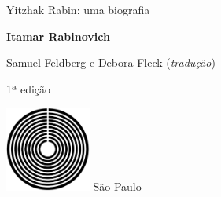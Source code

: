 




\begingroup\thispagestyle{empty}\vspace*{.05\textheight} 

              \formular
              
              \LARGE\noindent
              Yitzhak Rabin: uma biografia

                      

              \bigskip  
              
              \Large\noindent\textbf{Itamar Rabinovich}

              \vfill
              {\fontsize{30}{40}%
              \small\noindent 
              Samuel Feldberg e Debora Fleck (\textit{tradução})}
              
              \bigskip

              \noindent
              {\fontsize{30}{40}%
              \small\noindent 1ª edição}
              

              \vfill\noindent\includegraphics[width=0.21\textwidth]{logo}
              \break{} 
              \smallskip
              {\fontsize{30}{40}%
              \scriptsize\noindent{}São Paulo\quad\the\year}

\endgroup
\pagebreak
